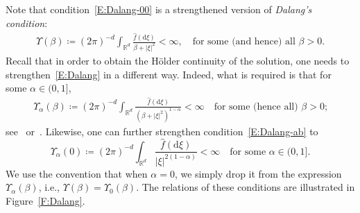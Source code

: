 \documentclass[a4paper,11pt]{article}%
\theoremstyle{plain}
\theoremstyle{definition}
\numberwithin{equation}{section}
\newcommand{\R}{\mathbb{R}}
\newcommand{\ud}{\ensuremath{\mathrm{d}}}
\begin{document}
Note that condition~\eqref{E:Dalang-00} is a strengthened version of \textit{Dalang's condition}:
\begin{align}\label{E:Dalang}
  \Upsilon(\beta) \coloneqq \left(2\pi\right)^{-d} \int_{\R^d} \frac{\hat{f}(\ud \xi)}{\beta+ |\xi|^2} <\infty,
  \quad \text{for some (and hence) all $\beta>0$.}
\end{align}
Recall that in order to obtain the H\"older continuity of the solution, one needs to
strengthen~\eqref{E:Dalang} in a different way. Indeed, what is required is that for some $\alpha\in
(0,1]$,
\begin{align}\label{E:Dalang-ab}
  \Upsilon_\alpha(\beta) \coloneqq \left(2\pi\right)^{-d} \int_{\R^d} \frac{\widehat{f}(\ud\xi)}{\left(\beta+|\xi|^2\right)^{1-\alpha}}<\infty
  \quad \text{for some (hence all) $\beta>0$;}
\end{align}
see~\cite[Theorem 1.8]{chen.huang:19:comparison} or~\cite{sanz-sole.sarra:02:holder}. Likewise, one
can further strengthen condition~\eqref{E:Dalang-ab} to
\begin{equation}\label{E:Dalang-a0}
  \Upsilon_\alpha(0) \coloneqq \left(2\pi\right)^{-d} \int_{\R^d} \frac{\hat{f}(\ud \xi)}{|\xi|^{2(1-\alpha)}} <\infty
  \quad \text{for some $\alpha\in (0,1]$.}
\end{equation}
We use the convention that when $\alpha = 0$, we simply drop it from the expression
$\Upsilon_\alpha(\beta)$, i.e., $\Upsilon(\beta) = \Upsilon_0(\beta)$. The relations of these
conditions are illustrated in Figure~\ref{F:Dalang}.

\end{document}
